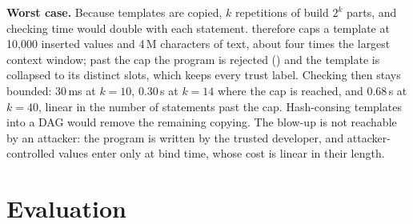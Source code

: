 \documentclass[journal]{IEEEtran}
\begin{document}
\textbf{Worst case.} Because templates are copied, $k$ repetitions of  build $2^k$ parts, and checking time would double with each statement. \TL{} therefore caps a template at 10{,}000 inserted values and 4\,M characters of text, about four times the largest context window; past the cap the program is rejected () and the template is collapsed to its distinct slots, which keeps every trust label. Checking then stays bounded: 30\,ms at $k{=}10$, 0.30\,s at $k{=}14$ where the cap is reached, and 0.68\,s at $k{=}40$, linear in the number of statements past the cap. Hash-consing templates into a DAG would remove the remaining copying. The blow-up is not reachable by an attacker: the program is written by the trusted developer, and attacker-controlled values enter only at bind time, whose cost is linear in their length.

\section{Evaluation}\label{sec:eval}
\end{document}
